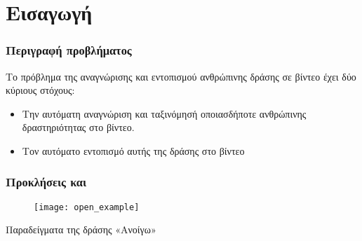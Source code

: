 



% 

\section{Εισαγωγή}

\begin{frame}
  \frametitle{Περιγραφή προβλήματος}
  Το πρόβλημα της αναγνώρισης και εντοπισμού ανθρώπινης δράσης σε βίντεο έχει δύο κύριους στόχους:
  \begin{itemize}[(I)]
  \item<2-> Την αυτόματη αναγνώριση και ταξινόμησή οποιασδήποτε ανθρώπινης δραστηριότητας στο βίντεο.
  \item<3-> Τον αυτόματο εντοπισμό αυτής της δράσης στο βίντεο
  \end{itemize}

\end{frame}

\begin{frame}
  \frametitle{Προκλήσεις και }
  \begin{figure}
    \texttt{[image: open\_example]}
  \end{figure}
  \pause
  Παραδείγματα της δράσης «Ανοίγω»

\end{frame}




% 